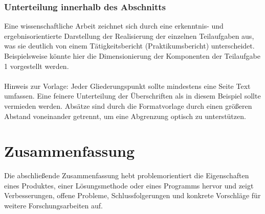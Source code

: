 \documentclass[%
  paper=a4,
  fontsize=12pt,
  twoside=false,
  headsepline=true,
  numbers=noenddot]{scrartcl}
\begin{document}
\subsubsection{Unterteilung innerhalb des Abschnitts}

Eine wissenschaftliche Arbeit zeichnet sich durch eine erkenntnis- und ergebnisorientierte Darstellung der Realisierung der einzelnen Teilaufgaben aus, was sie deutlich von einem Tätigkeitsbericht (Praktikumsbericht) unterscheidet. Beispielsweise könnte hier die Dimensionierung der Komponenten der Teilaufgabe 1 vorgestellt werden.\\\\
Hinweis zur Vorlage: Jeder Gliederungspunkt sollte mindestens eine Seite Text umfassen. Eine feinere Unterteilung der Überschriften als in diesem Beispiel sollte vermieden werden.
Absätze sind durch die Formatvorlage durch einen größeren Abstand voneinander getrennt, um eine Abgrenzung optisch zu unterstützen.




\section{Zusammenfassung}

Die abschließende Zusammenfassung hebt problemorientiert die Eigenschaften eines
Produktes, einer Lösungsmethode oder eines Programms hervor und zeigt Verbesserungen,
offene Probleme, Schlussfolgerungen und konkrete Vorschläge für weitere Forschungsarbeiten auf.

\end{document}
